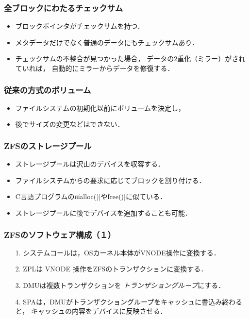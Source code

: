 \documentclass[handout]{beamer}                   %
\begin{document}
\begin{frame}
  \frametitle{全ブロックにわたるチェックサム}
  \vfill
  \begin{itemize}
    \item ブロックポインタがチェックサムを持つ．
    \item メタデータだけでなく普通のデータにもチェックサムあり．
    \item チェックサムの不整合が見つかった場合，
      データの2重化（ミラー）がされていれば，
      自動的にミラーからデータを修復する．
  \end{itemize}
  \vfill
\end{frame}

\begin{frame}[fragile]
  \frametitle{従来の方式のボリューム}
  \vfill
  \begin{itemize}
  \item ファイルシステムの初期化以前にボリュームを決定し，
  \item 後でサイズの変更などはできない．
  \end{itemize}
  \vfill
\end{frame}
  
\begin{frame}[fragile]
  \frametitle{ZFSのストレージプール}
  \vfill
  \begin{itemize}
  \item ストレージプールは沢山のデバイスを収容する．
  \item ファイルシステムからの要求に応じてブロックを割り付ける．
  \item C言語プログラムの\|malloc()|や\|free()|に似ている．
  \item ストレージプールに後でデバイスを追加することも可能．
  \end{itemize}
  \vfill
\end{frame}
  
\begin{frame}[fragile]
  \frametitle{ZFSのソフトウェア構成（１）}
  \vfill
  \begin{enumerate}
  \item[1.] システムコールは，OSカーネル本体がVNODE操作に変換する．
  \item[2.] ZPLは VNODE 操作をZFSのトランザクションに変換する．
  \item[3.] DMUは複数トランザクションを
    \emph{トランザショングループ}にする．
  \item[4.] SPAは，DMUがトランザクショングループをキャッシュに書込み終わると，
    キャッシュの内容をデバイスに反映させる．
  \end{enumerate}  
  \vfill
\end{frame}
\end{document}
